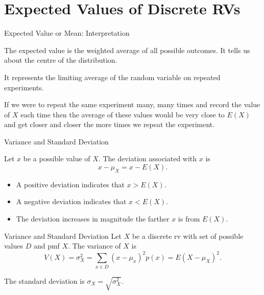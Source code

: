 \section{Expected Values of Discrete RVs}

\begin{frame}
  \begin{block}{Expected Value or Mean: Interpretation}
    
  
    The expected value is the weighted average of all possible outcomes. It tells us about the centre of the distribution.
    
    \medskip
    It represents the limiting average of the random variable on repeated experiments. 
    
    \medskip
    
    If we were to repeat the same experiment many, many times and record the value of $X$ each time then the average of these values would be very close to $E(X)$ and get closer and closer the more times we repeat the experiment. 
  \end{block}
\end{frame}

\begin{frame}
  \begin{block}{Variance and Standard Deviation}
  
  Let $x$ be a possible value of $X$. The deviation associated with $x$ is
  $$
  x-\mu_X = x - E(X).
  $$
  
  \medskip
  \begin{itemize}
  \item A positive deviation indicates that $x > E(X)$.
  \item A negative deviation indicates that $x < E(X)$.
  \item The deviation increases in magnitude the farther $x$ is from $E(X)$. 
  \end{itemize}
  \end{block}
\end{frame}

\begin{frame}
  \begin{block}{Variance and Standard Deviation}
    Let $X$ be a discrete rv with set of possible values $D$ and pmf $X$. The variance of $X$ is
    \[
      V(X)=\sigma^2_X=\sum_{x\in D} (x-\mu_x)^2p(x)=E(X-\mu_X)^2.
    \]

    \vspace{-.2in}

    The standard deviation is $\sigma_X=\sqrt{\sigma^2_X}$.

  \end{block}
\end{frame}

